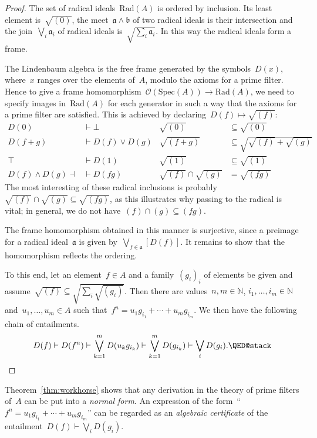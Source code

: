 \documentclass{ws-rv9x6}
\renewcommand{\O}{\mathcal{O}}
\newcommand{\NN}{\mathbb{N}}
\newcommand{\aaa}{\mathfrak{a}}
\newcommand{\bbb}{\mathfrak{b}}
\newcommand{\Spec}{\mathrm{Spec}}
\newcommand{\Rad}{\mathrm{Rad}}
\renewcommand{\_}{\mathpunct{.}}
\newcommand{\?}{\,{:}\,}
\begin{document}
\begin{proof}The set of radical ideals~$\Rad(A)$ is ordered by inclusion. Its
least element is~$\sqrt{(0)}$, the meet~$\aaa \wedge \bbb$ of two radical
ideals is their intersection and the join~$\bigvee_i \aaa_i$ of radical ideals
is~$\sqrt{\sum_i \aaa_i}$. In this way the radical ideals form a frame.

The Lindenbaum algebra is the free frame generated by the symbols~$D(x)$,
where~$x$ ranges over the elements of~$A$, modulo the axioms for a prime
filter. Hence to give a frame homomorphism~$\O(\Spec(A)) \to \Rad(A)$, we need
to specify images in~$\Rad(A)$ for each generator in such a way that the
axioms for a prime filter are satisfied. This is achieved by declaring~$D(f)
\mapsto \sqrt{(f)}$:
\begin{align*}
  D(0) &\vdash \bot & \sqrt{(0)} &\subseteq \sqrt{(0)} \\
  D(f+g) &\vdash D(f) \vee D(g) & \sqrt{(f+g)} &\subseteq\textstyle \sqrt{\sqrt{(f)} + \sqrt{(g)}} \\
  \top &\vdash D(1) & \sqrt{(1)} &\subseteq \sqrt{(1)} \\
  D(f) \wedge D(g) \dashv\!&\vdash D(fg) & \sqrt{(f)} \cap \sqrt{(g)} &= \sqrt{(fg)}
\end{align*}
The most interesting of these radical inclusions is probably~$\sqrt{(f)} \cap
\sqrt{(g)} \subseteq \sqrt{(fg)}$, as this illustrates why passing to the
radical is vital; in general, we do not have~$(f) \cap (g) \subseteq (fg)$.

The frame homomorphism obtained in this manner is surjective, since a preimage
for a radical ideal~$\aaa$ is given by~$\bigvee_{f \in \aaa} [D(f)]$. It
remains to show that the homomorphism reflects the ordering.

To this end, let an element~$f \in A$ and a family~$(g_i)_i$ of elements be
given and assume~$\sqrt{(f)} \subseteq \sqrt{\sum_i \sqrt{(g_i)}}$. Then there
are values~$n,m \in \NN$, $i_1,\ldots,i_m \in \NN$ and~$u_1,\ldots,u_m \in
A$ such that~$f^n = u_1 g_{i_1} + \cdots + u_m g_{i_m}$. We then have the
following chain of entailments.
\[
  D(f) \vdash
  D(f^n) \vdash
  \bigvee_{k=1}^m D(u_k g_{i_k}) \vdash
  \bigvee_{k=1}^m D(g_{i_k}) \vdash
  \bigvee_i D(g_i). \qedhere
\]
\end{proof}

Theorem~\ref{thm:workhorse} shows that any derivation in the theory of prime
filters of~$A$ can be put into a \emph{normal form}. An expression of the
form~``$f^n = u_1 g_{i_1} + \cdots + u_m g_{i_m}$'' can be regarded as an
\emph{algebraic certificate} of the entailment~$D(f) \vdash \bigvee_i D(g_i)$.
\end{document}

